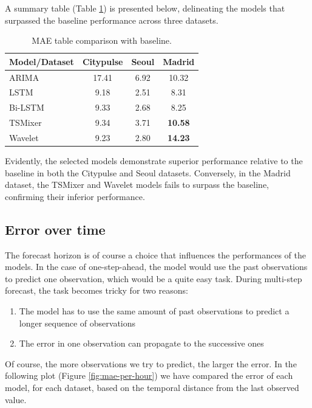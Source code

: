 A summary table (Table \ref{tab:baseline-comparison}) is presented below, delineating the models that surpassed the baseline performance across three datasets.

\begin{table}[]
\centering
\begin{tabular}{lccc}
\toprule
\textbf{Model/Dataset} & \textbf{Citypulse} & \textbf{Seoul} & \textbf{Madrid} \\ 
\midrule
ARIMA & 17.41 & 6.92 & 10.32 \\
LSTM & 9.18 & 2.51 & 8.31 \\
Bi-LSTM & 9.33 & 2.68 & 8.25 \\
TSMixer \cite{chen2023tsmixer} & 9.34 & 3.71 & \textbf{10.58} \\
Wavelet & 9.23 & 2.80 & \textbf{14.23} \\
\bottomrule
\end{tabular}
\caption{MAE table comparison with baseline.}
\label{tab:baseline-comparison}
\end{table}

Evidently, the selected models demonstrate superior performance relative to the baseline in both the Citypulse and Seoul datasets. Conversely, in the Madrid dataset, the TSMixer and Wavelet models fails to surpass the baseline, confirming their inferior performance.

\subsection{Error over time}

The forecast horizon is of course a choice that influences the performances of the models. In the case of one-step-ahead, the model would use the past observations to predict one observation, which would be a quite easy task. During multi-step forecast, the task becomes tricky for two reasons:
\begin{enumerate}
    \item The model has to use the same amount of past observations to predict a longer sequence of observations
    \item The error in one observation can propagate to the successive ones
\end{enumerate}

Of course, the more observations we try to predict, the larger the error.
In the following plot (Figure \ref{fig:mae-per-hour}) we have compared the error of each model, for each dataset, based on the temporal distance from the last observed value.

